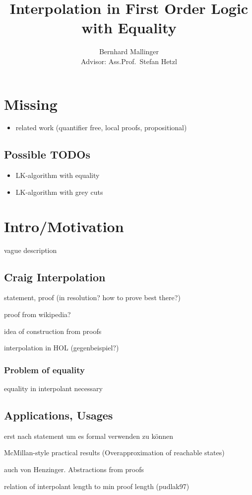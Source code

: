 \documentclass[,%
			paper=a4,%
			DIV12,
			liststotoc,
			bibtotoc,
			draft=false,%
			numbers=noendperiod
			]{scrartcl}
\title{Interpolation in First Order Logic with Equality}
\author{Bernhard Mallinger \medskip \\
Advisor: Ass.Prof.\ Stefan Hetzl}
\theoremstyle{definition}
\begin{document}
\tableofcontents

\section{Missing}
\begin{itemize}
	\item related work (quantifier free, local proofs, propositional)
\end{itemize}

\subsection{Possible TODOs}
\begin{itemize}
	\item LK-algorithm with equality
	\item LK-algorithm with grey cuts
\end{itemize}

\section{Intro/Motivation}

	vague description

	\subsection{Craig Interpolation}
		statement, proof (in resolution? how to prove best there?)
		
		proof from wikipedia? 

		idea of construction from proofs

		interpolation in HOL (gegenbeispiel?)
	\subsubsection{Problem of equality}
		equality in interpolant necessary

	\subsection{Applications, Usages}
		erst nach statement um es formal verwenden zu können

		McMillan-style practical results (Overapproximation of reachable states)

		auch von Henzinger. Abstractions from proofs

		relation of interpolant length to min proof length (pudlak97)
\end{document}
